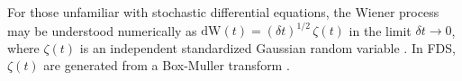 For those unfamiliar with stochastic differential equations, the Wiener process may be understood numerically as $\mbox{dW}(t) = (\delta t)^{1/2} \, \zeta(t)$ in the limit $\delta t \rightarrow 0$, where $\zeta(t)$ is an independent standardized Gaussian random variable \cite{Pope:2000}.  In FDS, $\zeta(t)$ are generated from a Box-Muller transform \cite{Box-Muller:1958}.






















